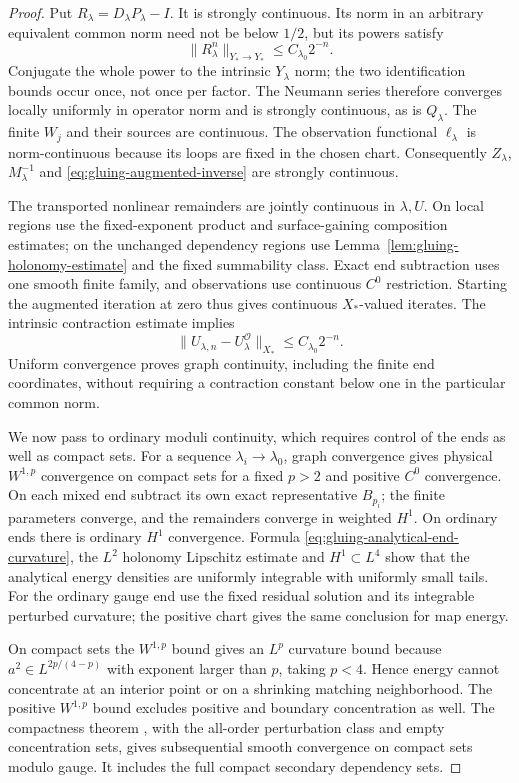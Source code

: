 \documentclass[11pt]{amsart}
\theoremstyle{definition}
\theoremstyle{remark}
\theoremstyle{plain}
\begin{document}
\begin{proof}
Put $R_\lambda=D_\lambda P_\lambda-I$. It is strongly
continuous. Its norm in an arbitrary equivalent common norm need
not be below $1/2$, but its powers satisfy
\[
                        \|R_\lambda^n\|_{Y_*\to Y_*}
                                            \leq C_{\lambda_0}2^{-n}.
\]
Conjugate the whole power to the intrinsic $Y_\lambda$ norm;
the two identification bounds occur once, not once per factor.
The Neumann series therefore converges locally uniformly in operator
norm and is strongly continuous, as is $Q_\lambda$.
The finite $W_j$ and their sources are continuous. The observation
functional $\ell_\lambda$ is norm-continuous because its loops
are fixed in the chosen chart. Consequently $Z_\lambda$,
$M_\lambda^{-1}$ and \eqref{eq:gluing-augmented-inverse} are
strongly continuous.

The transported nonlinear remainders are jointly continuous in
$\lambda,U$. On local regions use the fixed-exponent product and
surface-gaining composition estimates; on the unchanged dependency
regions use Lemma~\ref{lem:gluing-holonomy-estimate} and the
fixed summability class. Exact end subtraction uses one smooth
finite family, and observations use continuous $C^0$ restriction.
Starting the augmented iteration at zero thus gives continuous
$X_*$-valued iterates. The intrinsic contraction estimate implies
\[
                   \|U_{\lambda,n}-U_\lambda^{\mathcal O}\|_{X_*}
                                               \leq C_{\lambda_0}2^{-n}.
\]
Uniform convergence proves graph continuity, including the finite
end coordinates, without requiring a contraction constant below one
in the particular common norm.

We now pass to ordinary moduli continuity, which requires control
of the ends as well as compact sets. For a sequence
$\lambda_i\to\lambda_0$, graph convergence gives physical
$W^{1,p}$ convergence on compact sets for a fixed $p>2$ and
positive $C^0$ convergence. On each mixed end subtract its own
exact representative $B_{p_i}$; the finite parameters converge,
and the remainders converge in weighted $H^1$. On ordinary ends
there is ordinary $H^1$ convergence. Formula
\eqref{eq:gluing-analytical-end-curvature}, the $L^2$ holonomy
Lipschitz estimate and $H^1\subset L^4$ show that the analytical
energy densities are uniformly integrable with uniformly small tails.
For the ordinary gauge end use the fixed residual solution and its
integrable perturbed curvature; the positive chart gives the same
conclusion for map energy.

On compact sets the $W^{1,p}$ bound gives an $L^p$ curvature
bound because $a^2\in L^{2p/(4-p)}$ with exponent larger than
$p$, taking $p<4$. Hence energy cannot concentrate at an interior
point or on a shrinking matching neighborhood. The positive
$W^{1,p}$ bound excludes positive and boundary concentration as well.
The compactness theorem \cite[Theorem~5.2]{DaeFukLip21a},
with the all-order perturbation class and empty concentration sets,
gives subsequential smooth convergence on compact sets modulo gauge.
It includes the full compact secondary dependency sets.


\end{proof}
\end{document}

